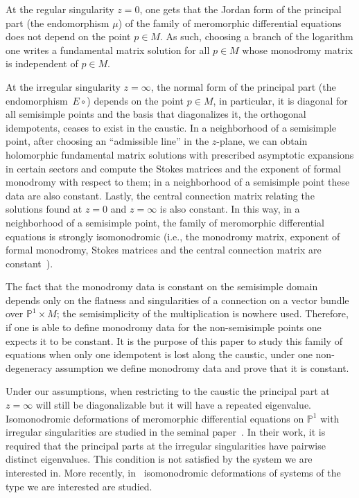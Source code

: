 \documentclass[pdftex]{sigma}
\numberwithin{equation}{section}
\begin{document}
 At the regular singularity $z=0$, one gets that the Jordan form of the principal part (the endomorphism $\mu$) of the family of meromorphic differential equations does not depend on the point $p\in M$. As such, choosing a branch of the logarithm one writes a fundamental matrix solution for all $p\in M$ whose monodromy matrix is independent of $p\in M$.

 At the irregular singularity $z=\infty$, the normal form of the principal part (the endomorphism~$E\circ$) depends on the point $p\in M$, in particular, it is diagonal for all semisimple points and the basis that diagonalizes it, the orthogonal idempotents, ceases to exist in the caustic. In a neighborhood of a semisimple point, after choosing an ``admissible line'' in the $z$-plane, we can obtain holomorphic fundamental matrix solutions with prescribed asymptotic expansions in certain sectors and compute the Stokes matrices and the exponent of formal monodromy with respect to them; in a neighborhood of a semisimple point these data are also constant. Lastly, the central connection matrix relating the solutions found at $z=0$ and $z=\infty$ is also constant. In this way, in a neighborhood of a semisimple point, the family of meromorphic differential equations is strongly isomonodromic (i.e., the monodromy matrix, exponent of formal monodromy, Stokes matrices and the central connection matrix are constant~\cite{Dubrovin:1994hc,Dubrovin:1998fe}).

The fact that the monodromy data is constant on the semisimple domain depends only on the flatness and singularities of a connection on a vector bundle over $\mathbb{P}^{1}\times M$; the semisimplicity of the multiplication is nowhere used. Therefore, if one is able to define monodromy data for the non-semisimple points one expects it to be constant. It is the purpose of this paper to study this family of equations when only one idempotent is lost along the caustic, under one non-degeneracy assumption we define monodromy data and prove that it is constant.

Under our assumptions, when restricting to the caustic the principal part at $z=\infty$ will still be diagonalizable but it will have a repeated eigenvalue. Isomonodromic deformations of meromorphic differential equations on $\mathbb{P}^{1}$ with irregular singularities are studied in the seminal paper~\cite{a0b55245f91244e5bd4b591a56f5a1cb}. In their work, it is required that the principal parts at the irregular singularities have pairwise distinct eigenvalues. This condition is not satisfied by the system we are interested in. More recently, in~\cite{Guzzetti_2022} isomonodromic deformations of systems of the type we are interested are studied.
\end{document}
